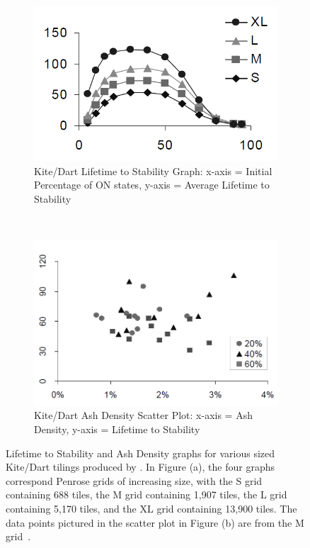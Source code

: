 \documentclass[a4paper,11pt]{report}
\begin{document}
\begin{figure}[htp]
\centering
\begin{subfigure}[t]{0.6\textwidth}
	\centering
	\includegraphics[width=\textwidth]{ch4_figs/hi05_fig7_lifetime}
	\caption{Kite/Dart Lifetime to Stability Graph: x-axis = Initial Percentage of ON states, y-axis = Average Lifetime to Stability}
\end{subfigure}
~
\begin{subfigure}[t]{0.6\textwidth}
	\centering
	\includegraphics[width=\textwidth]{ch4_figs/hi05_fig8_ash_density}
	\caption{Kite/Dart Ash Density Scatter Plot: x-axis = Ash Density, y-axis = Lifetime to Stability}
\end{subfigure}
\caption[\citeauthor{hi05}'s Kite/Dart Lifetime and Ash Density Graphs]{
	Lifetime to Stability and Ash Density graphs for various sized Kite/Dart tilings produced by \citeauthor{hi05}. In Figure (a), the four graphs correspond Penrose grids of increasing size, with the S grid containing 688 tiles, the M grid containing 1,907 tiles, the L grid containing 5,170 tiles, and the XL grid containing 13,900 tiles. The data points pictured in the scatter plot in Figure (b) are from the M grid~\cite{hi05}.
}
\label{fig:hi05_lifetime_density}
\end{figure}
\end{document}
